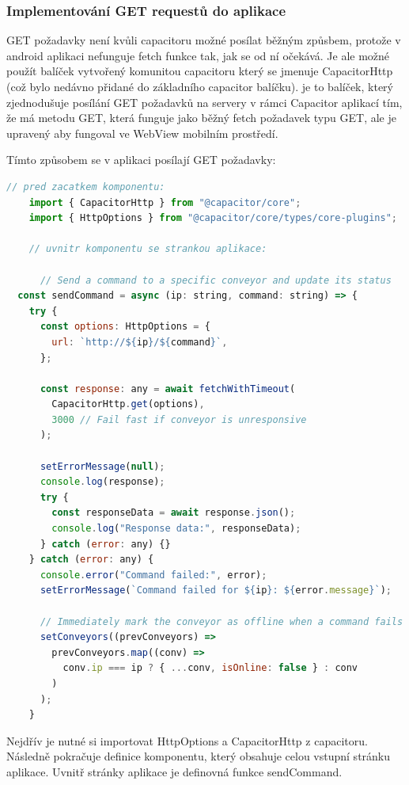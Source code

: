 \subsubsection{Implementování GET requestů do aplikace}

GET požadavky není kvůli capacitoru možné posílat běžným způsbem, protože v android aplikaci nefunguje fetch funkce tak, jak se od ní očekává. Je ale možné použít balíček vytvořený komunitou capacitoru který se jmenuje CapacitorHttp (což bylo nedávno přidané do základního capacitor balíčku). je to balíček, který zjednodušuje posílání GET požadavků na servery v rámci Capacitor aplikací tím, že má metodu GET, která funguje jako běžný fetch požadavek typu GET, ale je upravený aby fungoval ve WebView mobilním prostředí.

Tímto způsobem se v aplikaci posílají GET požadavky:
\begin{lstlisting}[language=JavaScript, caption={Funkce sendCommand dostupná uvnitř vstupní stránky aplikace}, label={lst:SendCommandFunkce}]
    // pred zacatkem komponentu:
    import { CapacitorHttp } from "@capacitor/core";
    import { HttpOptions } from "@capacitor/core/types/core-plugins";

    // uvnitr komponentu se strankou aplikace:

      // Send a command to a specific conveyor and update its status
  const sendCommand = async (ip: string, command: string) => {
    try {
      const options: HttpOptions = {
        url: `http://${ip}/${command}`,
      };

      const response: any = await fetchWithTimeout(
        CapacitorHttp.get(options),
        3000 // Fail fast if conveyor is unresponsive
      );

      setErrorMessage(null);
      console.log(response);
      try {
        const responseData = await response.json();
        console.log("Response data:", responseData);
      } catch (error: any) {}
    } catch (error: any) {
      console.error("Command failed:", error);
      setErrorMessage(`Command failed for ${ip}: ${error.message}`);

      // Immediately mark the conveyor as offline when a command fails
      setConveyors((prevConveyors) =>
        prevConveyors.map((conv) =>
          conv.ip === ip ? { ...conv, isOnline: false } : conv
        )
      );
    }
\end{lstlisting}
Nejdřív je nutné si importovat HttpOptions a CapacitorHttp z capacitoru. Následně pokračuje definice komponentu, který obsahuje celou vstupní stránku aplikace. Uvnitř stránky aplikace je definovná funkce sendCommand.

